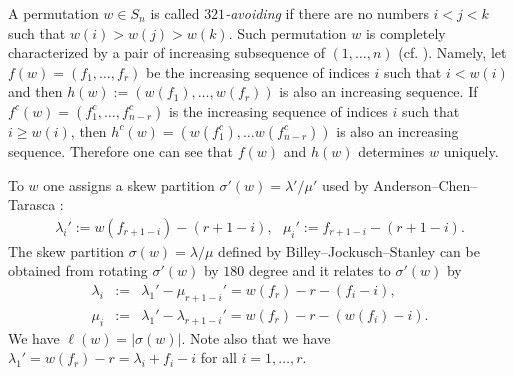 \documentclass[11pt,reqno,sumlimits]{amsart}
\theoremstyle{definition}
\numberwithin{equation}{section}
\begin{document}
A permutation $w \in S_n$ is called {\it $321$-avoiding} if there are no numbers $i<j<k$ such that $w(i)>w(j)>w(k)$. Such permutation $w$ is completely characterized by a pair of increasing subsequence of $(1,\dots, n)$ (cf. \cite[$\S$2]{ErikssonLinusson}). Namely, let $f(w)=(f_1,\dots, f_r)$ be the increasing sequence of indices $i$ such that $i<w(i)$ and then $h(w):=(w(f_1),\dots, w(f_r))$ is also an increasing sequence. If $f^c(w)=(f_1^c,\dots, f_{n-r}^c)$ is the increasing sequence of indices $i$ such that $i\geq w(i)$, then $h^c(w)=(w(f_1^c),\dots w(f_{n-r}^c))$ is also an increasing sequence. Therefore one can see that $f(w)$ and $h(w)$ determines $w$ uniquely.

To $w$ one assigns a skew partition $\sigma'(w)=\lambda'/\mu'$ used by Anderson--Chen--Tarasca \cite{AndersonChenTarasca}: 
\begin{eqnarray*}
\lambda_i':=
w(f_{r+1-i}) - (r+1-i),\ \ \ 
\mu_i':=f_{r+1-i}- (r+1 - i).
\end{eqnarray*}
The skew partition $\sigma(w)=\lambda/\mu$ defined by Billey--Jockusch--Stanley \cite{BilleyJockuschStanley} can be obtained from rotating $\sigma'(w)$ by $180$ degree  and it relates to $\sigma'(w)$ by
\begin{eqnarray}
\lambda_i&:=& 
\lambda_1' - \mu_{r+1-i}'= 
w(f_r)-r - (f_i-i),\label{lamdef}\\ 
\mu_i &:=& 
\lambda_1' - \lambda_{r+1-i}' = 
w(f_r)-r - (w(f_i)-i).\label{mudef}
\end{eqnarray}
We have $\ell(w)=|\sigma(w)|$. Note also that we have $\lambda_1' = w(f_r)-r=\lambda_i + f_i -i$ for all $i=1,\dots, r$. 
\end{document}
